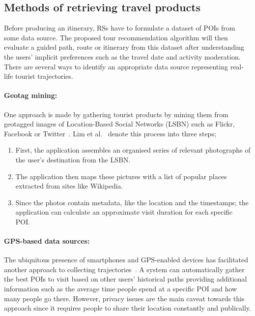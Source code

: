 \subsection{Methods of retrieving travel products}

Before producing an itinerary, RSs have to formulate a dataset of POIs from
some data source. The proposed tour recommendation algorithm will then evaluate
a guided path, route or itinerary from this dataset after understanding the
users' implicit preferences such as the travel date and activity moderation. There are several ways to identify an appropriate
data source representing real-life tourist trajectories.  


\paragraph{Geotag mining:} One approach is made by gathering tourist products by mining them from
geotagged images of Location-Based Social Networks (LSBN) such as Flickr,
Facebook or Twitter~\cite{DeChoudhury2010, Memon2015, Lucchese2012, Lim2018a,
HuiLim, HuiLima, Kurashima2013, Kurashima2010, Brilhante2013, Brilhante2015 }.
Lim et al.~\cite{Lim2018} denote this process into three steps; 


\begin{enumerate}

\item First, the application assembles an organised series of relevant
    photographs of the user's destination from the LSBN.\@

\item The application then maps these pictures with a list of popular places
    extracted from sites like Wikipedia.

\item Since the photos contain metadata, like the location and the timestamps;
    the application can calculate an approximate visit duration for each
    specific POI.\

\end{enumerate}

\paragraph{GPS-based data sources:}
The ubiquitous presence of smartphones and
GPS-enabled devices has facilitated
another approach to collecting trajectories~\cite{10.1145/1889681.1889683,
10.1145/1526709.1526816, Chen2011a}. A system
can automatically gather the best POIs to visit based on other users'
historical paths providing additional information such as the average time
people spend at a specific POI and how many people go there. However, privacy
issues are the main caveat towards this approach since it requires people to
share their location constantly and publically\cite{Lim2018}.

